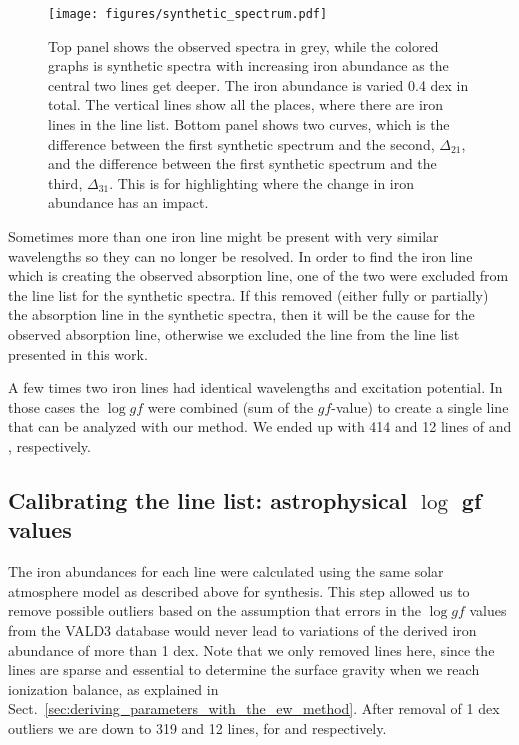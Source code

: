 \documentclass{aa}
\begin{document}
\begin{figure}[tpb]
    \centering
    \texttt{[image: figures/synthetic\_spectrum.pdf]}
    \caption{Top panel shows the observed spectra in grey, while the
    colored graphs is synthetic spectra with increasing iron abundance
    as the central two lines get deeper. The iron abundance is varied
    0.4 dex in total. The vertical lines show all the places, where there are
    iron lines in the line list. Bottom panel shows two curves, which is
    the difference between the first synthetic spectrum and the second,
    $\Delta_{21}$, and the difference between the first synthetic
    spectrum and the third, $\Delta_{31}$. This is for highlighting
    where the change in iron abundance has an impact.}
    \label{fig:synthesis}
\end{figure}


Sometimes more than one iron line might be present with very similar
wavelengths so they can no longer be resolved. In order to find the
iron line which is creating the observed absorption line, one of the
two were excluded from the line list for the synthetic spectra. If this
removed (either fully or partially) the absorption line in the synthetic
spectra, then it will be the cause for the observed absorption line,
otherwise we excluded the line from the line list presented in this
work.

A few times two iron lines had identical wavelengths and excitation
potential. In those cases the $\log \mathit{gf}$ were combined (sum of
the $\mathit{gf}$-value) to create a single line that can be analyzed
with our method. We ended up with 414 and 12 lines of  and
, respectively.


\subsection{Calibrating the line list: astrophysical $\log$ gf values}
\label{ssub:Recalibrating-the-atomic-data}

The iron abundances for each line were calculated using the same
solar atmosphere model as described above for synthesis. This step
allowed us to remove possible outliers based on the assumption that
errors in the $\log \mathit{gf}$ values from the VALD3 database
would never lead to variations of the derived iron abundance of more
than 1 dex. Note that we only removed  lines here, since
the  lines are sparse and essential to determine the
surface gravity when we reach ionization balance, as explained in
Sect.~\ref{sec:deriving_parameters_with_the_ew_method}. After removal
of 1 dex outliers we are down to 319 and 12 lines, for  and
 respectively.
\end{document}
